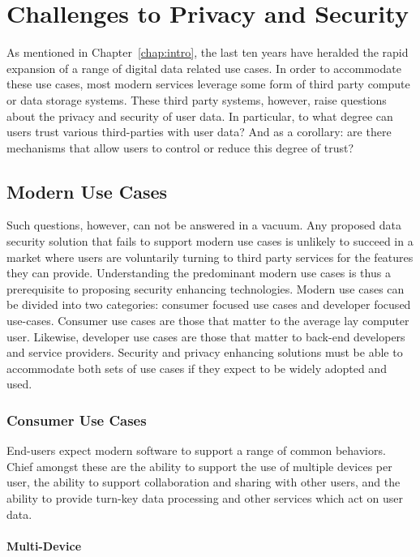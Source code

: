 \chapter{Challenges to Privacy and Security}
\label{chap:challenges}

As mentioned in Chapter~\ref{chap:intro}, the last ten years have
heralded the rapid expansion of a range of digital data related use
cases. In order to accommodate these use cases, most modern services
leverage some form of third party compute or data storage
systems. These third party systems, however, raise questions about the
privacy and security of user data. In particular, to what degree can
users trust various third-parties with user data? And as a corollary:
are there mechanisms that allow users to control or reduce this degree
of trust?

\section{Modern Use Cases}
\label{chap:challenges:usecases}

Such questions, however, can not be answered in a vacuum. Any proposed
data security solution that fails to support modern use cases is
unlikely to succeed in a market where users are voluntarily turning to
third party services for the features they can provide. Understanding
the predominant modern use cases is thus a prerequisite to proposing
security enhancing technologies. Modern use cases can be divided into
two categories: consumer focused use cases and developer focused
use-cases. Consumer use cases are those that matter to the average lay
computer user. Likewise, developer use cases are those that matter to
back-end developers and service providers. Security and privacy
enhancing solutions must be able to accommodate both sets of use cases
if they expect to be widely adopted and used.

\subsection{Consumer Use Cases}

End-users expect modern software to support a range of common
behaviors. Chief amongst these are the ability to support the use of
multiple devices per user, the ability to support collaboration and
sharing with other users, and the ability to provide turn-key data
processing and other services which act on user data.

\subsubsection{Multi-Device}

